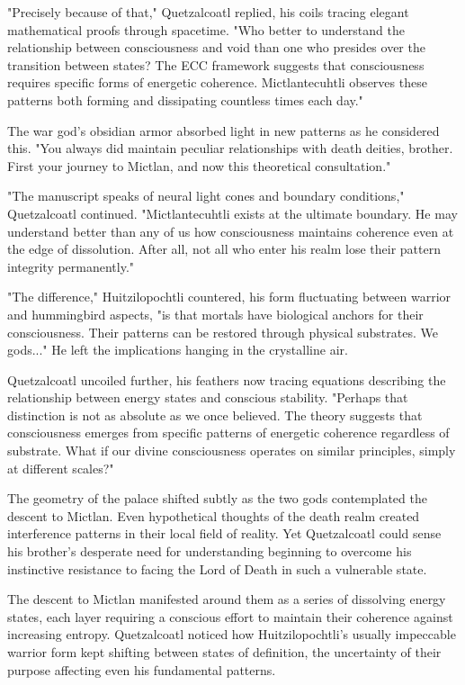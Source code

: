 \begin{refsection}
"Precisely because of that," Quetzalcoatl replied, his coils tracing elegant mathematical proofs through spacetime. "Who better to understand the relationship between consciousness and void than one who presides over the transition between states? The ECC framework suggests that consciousness requires specific forms of energetic coherence. Mictlantecuhtli observes these patterns both forming and dissipating countless times each day."

The war god's obsidian armor absorbed light in new patterns as he considered this. "You always did maintain peculiar relationships with death deities, brother. First your journey to Mictlan, and now this theoretical consultation."

"The manuscript speaks of neural light cones and boundary conditions," Quetzalcoatl continued. "Mictlantecuhtli exists at the ultimate boundary. He may understand better than any of us how consciousness maintains coherence even at the edge of dissolution. After all, not all who enter his realm lose their pattern integrity permanently."

"The difference," Huitzilopochtli countered, his form fluctuating between warrior and hummingbird aspects, "is that mortals have biological anchors for their consciousness. Their patterns can be restored through physical substrates. We gods..." He left the implications hanging in the crystalline air.

Quetzalcoatl uncoiled further, his feathers now tracing equations describing the relationship between energy states and conscious stability. "Perhaps that distinction is not as absolute as we once believed. The theory suggests that consciousness emerges from specific patterns of energetic coherence regardless of substrate. What if our divine consciousness operates on similar principles, simply at different scales?"

The geometry of the palace shifted subtly as the two gods contemplated the descent to Mictlan. Even hypothetical thoughts of the death realm created interference patterns in their local field of reality. Yet Quetzalcoatl could sense his brother's desperate need for understanding beginning to overcome his instinctive resistance to facing the Lord of Death in such a vulnerable state.

The descent to Mictlan manifested around them as a series of dissolving energy states, each layer requiring a conscious effort to maintain their coherence against increasing entropy. Quetzalcoatl noticed how Huitzilopochtli's usually impeccable warrior form kept shifting between states of definition, the uncertainty of their purpose affecting even his fundamental patterns.


\end{refsection}
